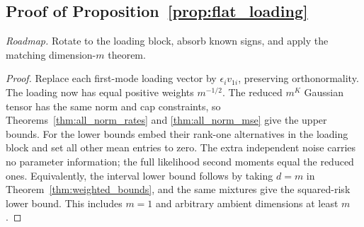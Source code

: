 \subsection{Proof of Proposition~\ref{prop:flat_loading}}
\noindent\emph{Roadmap.} Rotate to the loading block, absorb known signs, and apply the matching dimension-$m$ theorem.
\begin{proof}
Replace each first-mode loading vector by $\epsilon_i v_{1i}$, preserving orthonormality. The loading now has equal positive weights $m^{-1/2}$. The reduced $m^K$ Gaussian tensor has the same norm and cap constraints, so Theorems~\ref{thm:all_norm_rates} and \ref{thm:all_norm_mse} give the upper bounds. For the lower bounds embed their rank-one alternatives in the loading block and set all other mean entries to zero. The extra independent noise carries no parameter information; the full likelihood second moments equal the reduced ones. Equivalently, the interval lower bound follows by taking $d=m$ in Theorem~\ref{thm:weighted_bounds}, and the same mixtures give the squared-risk lower bound. This includes $m=1$ and arbitrary ambient dimensions at least $m$.
\end{proof}
